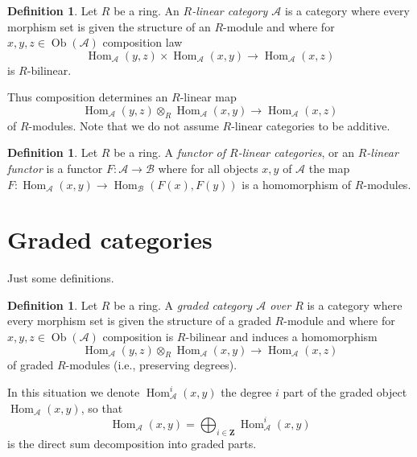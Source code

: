 \documentclass{stacks-project}
\theoremstyle{plain}
\theoremstyle{definition}
\newtheorem{definition}[subsection]{Definition}
\theoremstyle{remark}
\numberwithin{equation}{subsection}
\def\Hom{\mathop{\mathrm{Hom}}\nolimits}
\def\Ob{\mathop{\mathrm{Ob}}\nolimits}
\begin{document}
\begin{definition}
\label{definition-linear-category}
Let $R$ be a ring. An {\it $R$-linear category $\mathcal{A}$} is a category
where every morphism set is given the structure of an $R$-module
and where for $x, y, z \in \Ob(\mathcal{A})$ composition law
$$
\Hom_\mathcal{A}(y, z) \times \Hom_\mathcal{A}(x, y)
\longrightarrow
\Hom_\mathcal{A}(x, z)
$$
is $R$-bilinear.
\end{definition}

\noindent
Thus composition determines an $R$-linear map
$$
\Hom_\mathcal{A}(y, z) \otimes_R \Hom_\mathcal{A}(x, y)
\longrightarrow
\Hom_\mathcal{A}(x, z)
$$
of $R$-modules. Note that we do not assume $R$-linear categories to be
additive.

\begin{definition}
\label{definition-functor-linear-categories}
Let $R$ be a ring. A {\it functor of $R$-linear categories}, or an
{\it $R$-linear functor} is a functor $F : \mathcal{A} \to \mathcal{B}$
where for all objects $x, y$ of $\mathcal{A}$ the map
$F : \Hom_\mathcal{A}(x, y) \to \Hom_\mathcal{B}(F(x), F(y))$
is a homomorphism of $R$-modules.
\end{definition}







\section{Graded categories}
\label{section-graded}

\noindent
Just some definitions.

\begin{definition}
\label{definition-graded-category}
Let $R$ be a ring. A {\it graded category $\mathcal{A}$
over $R$} is a category where every morphism set is given the structure
of a graded $R$-module and where for
$x, y, z \in \Ob(\mathcal{A})$ composition is $R$-bilinear and induces
a homomorphism
$$
\Hom_\mathcal{A}(y, z) \otimes_R \Hom_\mathcal{A}(x, y)
\longrightarrow
\Hom_\mathcal{A}(x, z)
$$
of graded $R$-modules (i.e., preserving degrees).
\end{definition}

\noindent
In this situation we denote $\Hom_\mathcal{A}^i(x, y)$ the degree $i$
part of the graded object $\Hom_\mathcal{A}(x, y)$, so that
$$
\Hom_\mathcal{A}(x, y) =
\bigoplus\nolimits_{i \in \mathbf{Z}} \Hom_\mathcal{A}^i(x, y)
$$
is the direct sum decomposition into graded parts.
\end{document}
